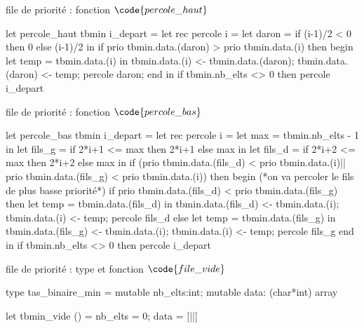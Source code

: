 \begin{adjustwidth}{-3cm}{-3cm}
\begin{implementation}{file de priorité : fonction $\code{percole\_haut}$}
    \begin{lstOCaml}
    let percole_haut tbmin i_depart =
        let rec percole i =
            let daron = if (i-1)/2 < 0 then 0 else (i-1)/2 in
            if prio tbmin.data.(daron) > prio tbmin.data.(i) then begin
                let temp = tbmin.data.(i) in
                tbmin.data.(i) <- tbmin.data.(daron);
                tbmin.data.(daron) <- temp;
                percole daron;
            end
        in if tbmin.nb_elts <> 0 then
            percole i_depart
    \end{lstOCaml}
\end{implementation}

\begin{implementation}{file de priorité : fonction $\code{percole\_bas}$}
    \begin{lstOCaml}
    let percole_bas tbmin i_depart =
        let rec percole i =
            let max = tbmin.nb_elts - 1 in
            let fils_g = if 2*i+1 <= max then 2*i+1 else max in
            let fils_d = if 2*i+2 <= max then 2*i+2 else max in
            if (prio tbmin.data.(fils_d) < prio tbmin.data.(i)|| 
                prio tbmin.data.(fils_g) < prio tbmin.data.(i)) then begin
                (*on va percoler le fils de plus basse priorité*)
                if prio tbmin.data.(fils_d) < prio tbmin.data.(fils_g) then
                    let temp = tbmin.data.(fils_d) in
                    tbmin.data.(fils_d) <- tbmin.data.(i);
                    tbmin.data.(i) <- temp;
                    percole fils_d
                else 
                    let temp = tbmin.data.(fils_g) in
                    tbmin.data.(fils_g) <- tbmin.data.(i);
                    tbmin.data.(i) <- temp;
                    percole fils_g
            end
        in if tbmin.nb_elts <> 0 then
            percole i_depart        
    \end{lstOCaml}
\end{implementation}

\begin{implementation}{file de priorité : type et fonction $\code{file\_vide}$}
    \begin{lstOCaml}
    type tas_binaire_min = {
        mutable nb_elts:int; 
        mutable data: (char*int) array
    }

    let tbmin_vide () = {nb_elts = 0; data = [||]}
    \end{lstOCaml}
\end{implementation}


\end{adjustwidth}
